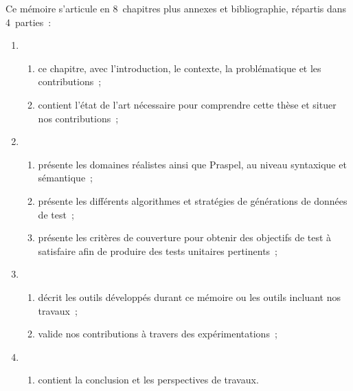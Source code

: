 Ce mémoire s'articule en 8~chapitres plus annexes et bibliographie, répartis
dans 4~parties~:
%
\begin{enumerate}

\item \begin{enumerate}

      \item ce chapitre, avec l'introduction, le contexte, la
      problématique et les contributions~;

      \item contient l'état de l'art nécessaire pour comprendre
      cette thèse et situer nos contributions~;

      \setcounter{myenum}{\theenumii}
      \end{enumerate}

\item \begin{enumerate}
      \setcounter{enumii}{\themyenum}

      \item présente les domaines réalistes ainsi que Praspel, au
      niveau syntaxique et sémantique~;

      \item présente les différents algorithmes et stratégies de
      générations de données de test~;

      \item présente les critères de couverture pour obtenir des
      objectifs de test à satisfaire afin de produire des tests unitaires
      pertinents~;

      \setcounter{myenum}{\theenumii}
      \end{enumerate}

\item \begin{enumerate}
      \setcounter{enumii}{\themyenum}

      \item décrit les outils développés durant ce mémoire ou les
      outils incluant nos travaux~;

      \item valide nos contributions à travers des
      expérimentations~;

      \setcounter{myenum}{\theenumii}
      \end{enumerate}

\item \begin{enumerate}
      \setcounter{enumii}{\themyenum}

      \item contient la conclusion et les perspectives de travaux.

      \end{enumerate}

\end{enumerate}
